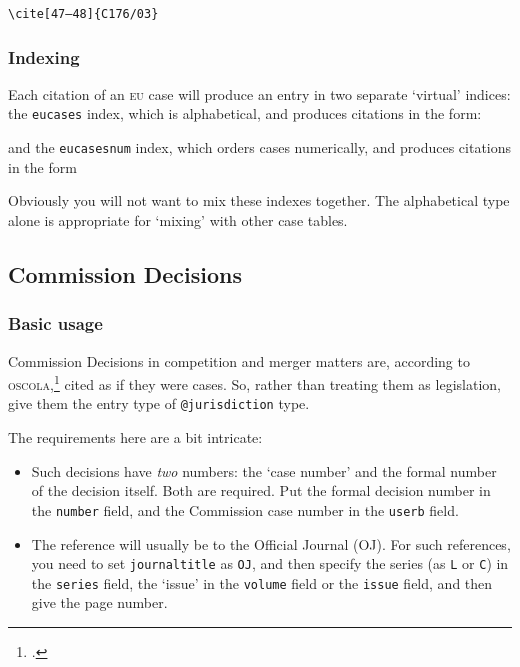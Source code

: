 \documentclass[a4paper,
               11pt,
	       DIV=1,			   
	       footinclude=false]
	      {scrartcl}
\newcommand{\oscolashort}{\textsc{oscola}\nocite{oscola}}
\newcommand{\egcite}[1]{{\texttt{\textbackslash cite#1}}}
\begin{document}
\begin{description}
\item[\egcite{[47--48]\{C176/03\}}]\cite[47--48]{C176/03} 
\end{description}

\subsubsection{Indexing}

Each citation of an \textsc{eu} case will produce an entry in two separate `virtual' indices: the \texttt{eucases} index, which is alphabetical, and produces citations in the form:
\begin{center}
\end{center}
and the \texttt{eucasesnum} index, which orders cases numerically, and produces citations in the form
\begin{center}
\end{center}
Obviously you will not want to mix these indexes together. The alphabetical type alone is appropriate for `mixing' with other case tables.


\subsection{Commission Decisions}

\subsubsection{Basic usage}

Commission Decisions\label{eudecisioncases} in competition and merger
matters are, according to \oscolashort,\footcite[30--31]{oscola} cited
as if they were cases. So, rather than treating them as legislation,
give them the entry type of \texttt{@jurisdiction} type.

The requirements here are a bit intricate:
\begin{itemize}
\item Such decisions have \emph{two} numbers: the `case number' and
  the formal number of the decision itself. Both are required. Put the
  formal decision number in the \texttt{number} field, and the
  Commission case number in the \texttt{userb} field.
\item The reference will usually be to the Official Journal (OJ). For
  such references, you need to set \texttt{journaltitle} as
  \texttt{OJ}, and then specify the series (as \texttt{L} or
  \texttt{C}) in the \texttt{series} field, the `issue' in the
  \texttt{volume} field or the \texttt{issue} field, and then give the
  page number.
\end{itemize}
\end{document}
